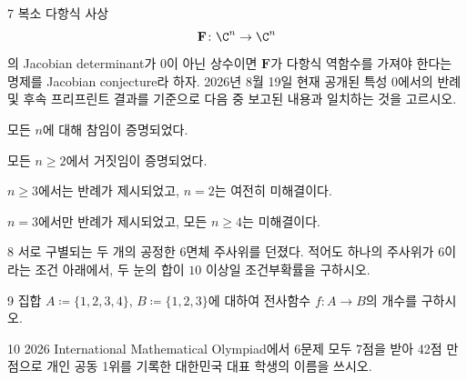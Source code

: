 \documentclass[11pt,oneside]{article}
\begin{document}
\newpage

\begin{problem}{7}
복소 다항식 사상
\[
    \mathbf{F}\colon\C^n\to\C^n
\]
의 Jacobian determinant가 0이 아닌 상수이면 $\mathbf{F}$가 다항식 역함수를 가져야 한다는 명제를 Jacobian conjecture라 하자. 2026년 8월 19일 현재 공개된 특성 0에서의 반례 및 후속 프리프린트 결과를 기준으로 다음 중 보고된 내용과 일치하는 것을 고르시오.

\begin{problemchoices}
    \item 모든 $n$에 대해 참임이 증명되었다.
    \item 모든 $n\geq2$에서 거짓임이 증명되었다.
    \item $n\geq3$에서는 반례가 제시되었고, $n=2$는 여전히 미해결이다.
    \item $n=3$에서만 반례가 제시되었고, 모든 $n\geq4$는 미해결이다.
\end{problemchoices}
\end{problem}

\begin{problem}{8}
서로 구별되는 두 개의 공정한 6면체 주사위를 던졌다. 적어도 하나의 주사위가 $6$이라는 조건 아래에서, 두 눈의 합이 $10$ 이상일 조건부확률을 구하시오.
\end{problem}

\begin{problem}{9}
집합 $A\coloneqq \{1,2,3,4\}$, $B\coloneqq \{1,2,3\}$에 대하여 전사함수 $f\colon A\to B$의 개수를 구하시오.
\end{problem}

\begin{problem}{10}
2026 International Mathematical Olympiad에서 6문제 모두 7점을 받아 42점 만점으로 개인 공동 1위를 기록한 대한민국 대표 학생의 이름을 쓰시오.
\end{problem}
\end{document}
